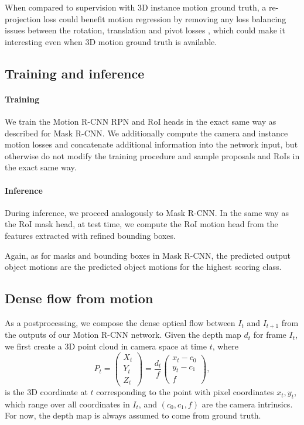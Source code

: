 When compared to supervision with 3D instance motion ground truth, a re-projection
loss could benefit motion regression by removing any loss balancing issues between the
rotation, translation and pivot losses \cite{PoseNet2},
which could make it interesting even when 3D motion ground truth is available.

\subsection{Training and inference}
\label{ssec:training_inference}
\paragraph{Training}
We train the Motion R-CNN RPN and RoI heads in the exact same way as described for Mask R-CNN.
We additionally compute the camera and instance motion losses and concatenate additional
information into the network input, but otherwise do not modify the training procedure
and sample proposals and RoIs in the exact same way.

\paragraph{Inference}
During inference, we proceed analogously to Mask R-CNN.
In the same way as the RoI mask head, at test time, we compute the RoI motion head
from the features extracted with refined bounding boxes.

Again, as for masks and bounding boxes in Mask R-CNN,
the predicted output object motions are the predicted object motions for the
highest scoring class.

\subsection{Dense flow from motion}
\label{ssec:postprocessing}
As a postprocessing, we compose the dense optical flow between $I_t$ and $I_{t+1}$ from the outputs of our Motion R-CNN network.
Given the depth map $d_t$ for frame $I_t$, we first create a 3D point cloud in camera space at time $t$,
where
\begin{equation}
P_t =
\begin{pmatrix}
X_t \\ Y_t \\ Z_t
\end{pmatrix}
=
\frac{d_t}{f}
\begin{pmatrix}
x_t - c_0 \\ y_t - c_1 \\ f
\end{pmatrix},
\end{equation}
is the 3D coordinate at $t$ corresponding to the point with pixel coordinates $x_t, y_t$,
which range over all coordinates in $I_t$,
and $(c_0, c_1, f)$ are the camera intrinsics.
For now, the depth map is always assumed to come from ground truth.


